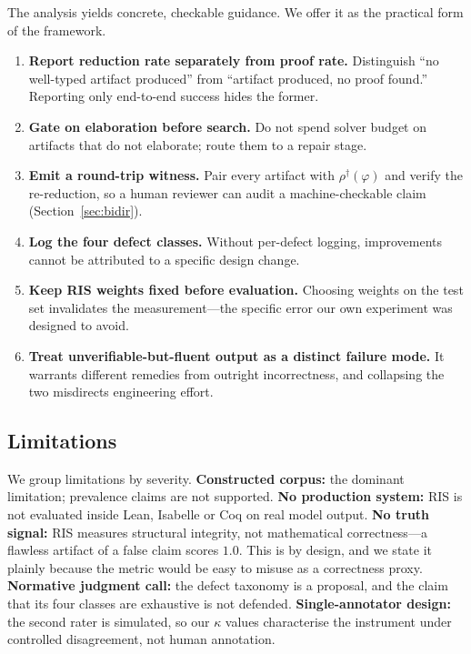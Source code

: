 \documentclass[11pt,a4paper]{article}
\theoremstyle{plain}
\theoremstyle{definition}
\newcommand{\RIS}{\textnormal{\textsc{RIS}}}
\begin{document}
The analysis yields concrete, checkable guidance. We offer it as the
practical form of the framework.

\begin{enumerate}[leftmargin=1.8em,label=\textbf{R\arabic*.}]
\item \textbf{Report reduction rate separately from proof rate.} Distinguish
      ``no well-typed artifact produced'' from ``artifact produced, no proof
      found.'' Reporting only end-to-end success hides the former.
\item \textbf{Gate on elaboration before search.} Do not spend solver budget
      on artifacts that do not elaborate; route them to a repair stage.
\item \textbf{Emit a round-trip witness.} Pair every artifact with
      $\rho^{\dagger}(\varphi)$ and verify the re-reduction, so a human
      reviewer can audit a machine-checkable claim (Section~\ref{sec:bidir}).
\item \textbf{Log the four defect classes.} Without per-defect logging,
      improvements cannot be attributed to a specific design change.
\item \textbf{Keep \RIS{} weights fixed before evaluation.} Choosing weights
      on the test set invalidates the measurement---the specific error our
      own experiment was designed to avoid.
\item \textbf{Treat unverifiable-but-fluent output as a distinct failure
      mode.} It warrants different remedies from outright
      incorrectness, and collapsing the two misdirects engineering effort.
\end{enumerate}

\subsection{Limitations}

We group limitations by severity. \textbf{Constructed corpus:} the dominant
limitation; prevalence claims are not supported. \textbf{No production
system:} \RIS{} is not evaluated inside Lean, Isabelle or Coq on real model
output. \textbf{No truth signal:} \RIS{} measures structural integrity, not
mathematical correctness---a flawless artifact of a false claim scores
$1.0$. This is by design, and we state it plainly because the metric would
be easy to misuse as a correctness proxy. \textbf{Normative judgment
call:} the defect taxonomy is a proposal, and the claim that its four
classes are exhaustive is not defended. \textbf{Single-annotator design:}
the second rater is simulated, so our $\kappa$ values characterise the
instrument under controlled disagreement, not human annotation.
\end{document}

